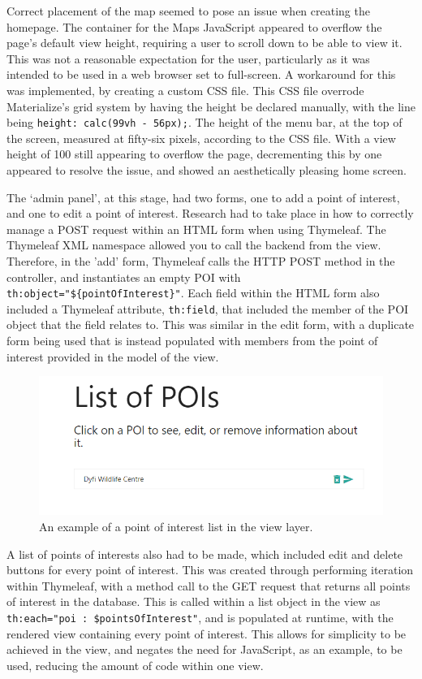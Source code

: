 Correct placement of the map seemed to pose an issue when creating the homepage. The container for the Maps JavaScript appeared to overflow the page's default view height, requiring a user to scroll down to be able to view it. This was not a reasonable expectation for the user, particularly as it was intended to be used in a web browser set to full-screen. A workaround for this was implemented, by creating a custom CSS file. This CSS file overrode Materialize's grid system by having the height be declared manually, with the line being \texttt{height: calc(99vh - 56px);}. The height of the menu bar, at the top of the screen, measured at fifty-six pixels, according to the CSS file. With a view height of 100 still appearing to overflow the page, decrementing this by one appeared to resolve the issue, and showed an aesthetically pleasing home screen.

The `admin panel', at this stage, had two forms, one to add a point of interest, and one to edit a point of interest. Research had to take place in how to correctly manage a POST request within an HTML form when using Thymeleaf. The Thymeleaf XML namespace allowed you to call the backend from the view. Therefore, in the 'add' form, Thymeleaf calls the HTTP POST method in the controller, and instantiates an empty POI with \texttt{th:object="\$\{pointOfInterest\}"}. Each field within the HTML form also included a Thymeleaf attribute, \texttt{th:field}, that included the member of the POI object that the field relates to. This was similar in the edit form, with a duplicate form being used that is instead populated with members from the point of interest provided in the model of the view.

\begin{figure}[H]
	\includegraphics[scale=1.0]{diagrams/listPOI}
	\caption{An example of a point of interest list in the view layer.}
\end{figure}	


A list of points of interests also had to be made, which included edit and delete buttons for every point of interest. This was created through performing iteration within Thymeleaf, with a method call to the GET request that returns all points of interest in the database. This is called within a list object in the view as \texttt{th:each="poi : \${pointsOfInterest}"}, and is populated at runtime, with the rendered view containing every point of interest. This allows for simplicity to be achieved in the view, and negates the need for JavaScript, as an example, to be used, reducing the amount of code within one view.

